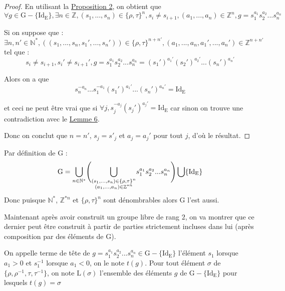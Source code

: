 \begin{proof}
  \hfill

  En utilisant la \hyperref[prop2]{Proposition 2}, on obtient que $$\forall g \in \mathrm{G}-\{\mathrm{Id_E}\}, \exists n \in \mathbb{Z},  (s_1, ..., s_n) \in \{\rho, \tau\}^n,s_i \neq s_{i+1}, (a_1, ..., a_n) \in \mathbb{Z}^n, g = s_1^{a_1}s_2^{a_2}...s_n^{a_n}$$\par
  Si on suppose que :$\exists n,n' \in \mathbb{N}^*,  ((s_1, ..., s_n,s_1', ..., s_n')) \in \{\rho, \tau\}^{n+n'}, (a_1, ..., a_n, a_1',...,a_n') \in \mathbb{Z}^{n+n'}$ tel que :
  $$s_i \neq s_{i+1},s_i' \neq s_{i+1}', g = s_1^{a_1}s_2^{a_2}...s_n^{a_n}= (s_1')^{a_1'}(s_2')^{a_2'}...(s_n')^{a_n'}$$\par
  Alors on a que $$s_n^{-a_n}...s_1^{-a_1}(s_1')^{a_1'}...(s_n')^{a_n'} = \mathrm{Id_E}$$\par
  et ceci ne peut être vrai que si $\forall j, s_j^{-a_j}(s_j')^{a_j'}=\mathrm{Id_E}$ car sinon on trouve une contradiction avec le \hyperref[lemme8]{Lemme 6}.\par
  Donc on conclut que $n=n'$, $s_j = s'_j$ et $a_j=a_j'$ pour tout $j$, d'où le résultat.
\end{proof}
\begin{remarkk}\label{remarkk6}
  Par définition de $\mathrm{G}$ : $$\mathrm{G}=\underset{n\in \mathbb{N}^*}{\bigcup}\Bigg( \underset{\begin{subarray}{c}
  (s_1, ..., s_n) \in \{\rho, \tau\}^n \\
  (a_1, ..., a_n) \in \mathbb{Z}^{*n}
    \end{subarray}}{\bigcup}s_1^{a_1}s_2^{a_2}...s_n^{a_n}\Bigg) \bigcup \{ \mathrm{Id_E}\}$$
  Donc puisque $\mathbb{N}^*$, $\mathbb{Z}^{*n}$ et $\{\rho, \tau\}^n$ sont dénombrables alors $\mathrm{G}$ l'est aussi.
\end{remarkk}
\noindent
Maintenant après avoir construit un groupe libre de rang $2$, on va montrer que ce dernier peut être construit à partir de parties strictement incluses dans lui (après composition par des éléments de $\mathrm{G}$).\par
\begin{definition}\label{6}
  On appelle terme de tête de $g=s_1^{a_1}s_2^{a_2}...s_n^{a_n}\in \mathrm{G}-\{ \mathrm{Id_E}\}$ l'élément $s_1$ lorsque $a_1 >0$ et $s_1^{-1}$ lorsque $a_1<0$, on le note $t(g)$. Pour tout élément $\sigma$ de $\{\rho, \rho^{-1}, \tau, \tau^{-1}\}$, on note $\mathrm{L}(\sigma)$ l'ensemble des éléments $g$ de $\mathrm{G}-\{\mathrm{Id_E}\}$ pour lesquels $t(g)=\sigma$
\end{definition}
